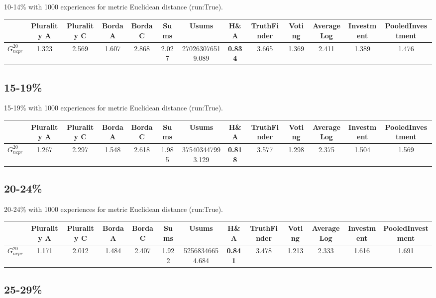 \documentclass{article}
\newcommand{\graph}[2]{$G_{#1}^{#2}$}
\begin{document}
10-14\% with 1000 experiences for metric Euclidean distance (run:True).

\noindent\begin{tabular}{|l|c|c|c|c|c|c|c|c|c|c|c|c|}
\hline
& Plurality A& Plurality C& Borda A& Borda C& Sums& Usums& H\&A& TruthFinder& Voting& AverageLog& Investment& PooledInvestment\\
\hline
\graph{ncpr}{20} &1.323&2.569&1.607&2.868&2.027&270263076519.089&\textbf{0.834}&3.665&1.369&2.411&1.389&1.476\\
\hline
\end{tabular}
\newpage

\subsection{15-19\%}

15-19\% with 1000 experiences for metric Euclidean distance (run:True).

\noindent\begin{tabular}{|l|c|c|c|c|c|c|c|c|c|c|c|c|}
\hline
& Plurality A& Plurality C& Borda A& Borda C& Sums& Usums& H\&A& TruthFinder& Voting& AverageLog& Investment& PooledInvestment\\
\hline
\graph{ncpr}{20} &1.267&2.297&1.548&2.618&1.985&375403447993.129&\textbf{0.818}&3.577&1.298&2.375&1.504&1.569\\
\hline
\end{tabular}
\newpage

\subsection{20-24\%}

20-24\% with 1000 experiences for metric Euclidean distance (run:True).

\noindent\begin{tabular}{|l|c|c|c|c|c|c|c|c|c|c|c|c|}
\hline
& Plurality A& Plurality C& Borda A& Borda C& Sums& Usums& H\&A& TruthFinder& Voting& AverageLog& Investment& PooledInvestment\\
\hline
\graph{ncpr}{20} &1.171&2.012&1.484&2.407&1.922&52568346654.684&\textbf{0.841}&3.478&1.213&2.333&1.616&1.691\\
\hline
\end{tabular}
\newpage

\subsection{25-29\%}
\end{document}
